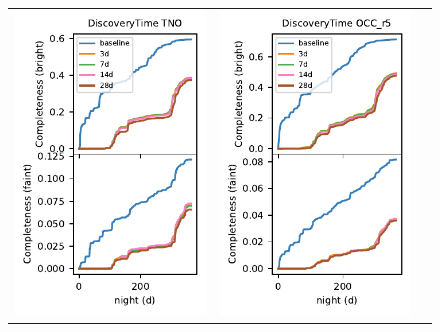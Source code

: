 \documentclass[preprintm,linenumbers]{aastex631}
\begin{document}
\begin{figure}
\begin{tabular}{@{}c@{}c@{}c@{}}
				\includegraphics{results/DiscoveryTime_TNO_first_year_one_snap_v4_0_10yrs_db_n_visits_4_noDD_noTwi.pdf} &
				\includegraphics{results/DiscoveryTime_OCC_r5_first_year_one_snap_v4_0_10yrs_db_n_visits_4_noDD_noTwi.pdf} &

\end{tabular}
\end{figure}
\end{document}
